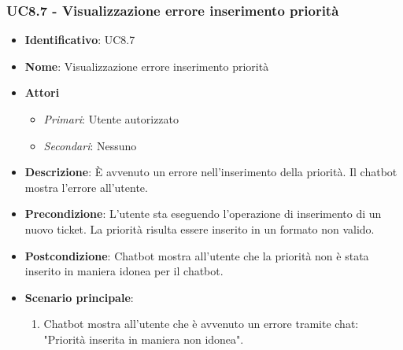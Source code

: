 \subsubsection{UC8.7 - Visualizzazione errore inserimento priorità}
\begin{itemize}
	\item \textbf{Identificativo}: UC8.7
	\item \textbf{Nome}:  Visualizzazione errore inserimento priorità
	\item \textbf{Attori}
	\begin{itemize} 
		\item \textit{Primari}: Utente autorizzato
		\item \textit{Secondari}: Nessuno
	\end{itemize}
	\item \textbf{Descrizione}: È avvenuto un errore nell'inserimento della priorità. Il chatbot mostra l'errore all'utente.
	\item \textbf{Precondizione}: L'utente sta eseguendo l'operazione di inserimento di un nuovo ticket. La priorità risulta essere inserito in un formato non valido. 
	\item \textbf{Postcondizione}: Chatbot mostra all'utente che la priorità non è stata inserito in maniera idonea per il chatbot.
	\item \textbf{Scenario principale}: \begin{enumerate}
		\item Chatbot mostra all'utente che è avvenuto un errore tramite chat: "Priorità inserita in maniera non idonea".
	\end{enumerate}
\end{itemize}